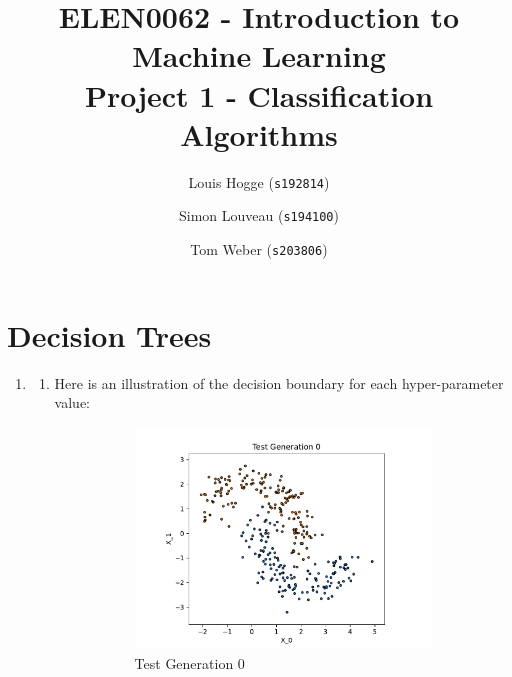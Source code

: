 \documentclass[acmconf,nonacm=true]{acmart}
\begin{document}
\title{ELEN0062 - Introduction to Machine Learning \\ 
Project 1 - Classification Algorithms}

\author{Louis Hogge (\texttt{s192814})}
\author{Simon Louveau (\texttt{s194100})}
\author{Tom Weber (\texttt{s203806})}

\maketitle

\section{Decision Trees}

\begin{enumerate}
    \item \begin{enumerate}
        \item Here is an illustration of the decision boundary for each hyper-parameter value:
        \begin{figure}[H]
            \centering
            \begin{subfigure}[b]{0.5\textwidth}
                \includegraphics[width=\textwidth]{test_generation_0.pdf}
                \caption{Test Generation 0}
                \label{fig:test_generation_0}
            \end{subfigure}%
            \begin{subfigure}[b]{0.5\textwidth}

\end{subfigure}
\end{figure}
\end{enumerate}
\end{enumerate}
\end{document}
